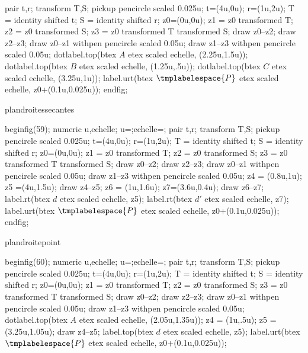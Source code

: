 {{{\begin{mplibcode}[PfLAC]
				pair t,r;
				transform T,S;
				pickup pencircle scaled 0.025u;
				t=(4u,0u); r=(1u,2u);
				T = identity shifted t;
				S = identity shifted r;
				z0=(0u,0u);
				z1 = z0 transformed T;
				z2 = z0 transformed S;
				z3 = z0 transformed T transformed S;
				draw z0--z2;
				draw z2--z3;
				draw z0--z1 withpen pencircle scaled 0.05u;
				draw z1--z3 withpen pencircle scaled 0.05u;
				dotlabel.top(btex $A$ etex scaled echelle, (2.25u,1.5u));
				dotlabel.top(btex $B$ etex scaled echelle, (1.25u,.5u));
				dotlabel.top(btex $C$ etex scaled echelle, (3.25u,1u));
				label.urt(btex $\tmplabelespace{P}$ etex scaled echelle, z0+(0.1u,0.025u));
				endfig;
			\end{mplibcode}
		}%
		{plandroitessecantes}{%
			\begin{mplibcode}[PfLAD]
				beginfig(59);
				numeric u,echelle;
				u=\scaleminischemspace*1cm;echelle=\scaleminischemspace;
				pair t,r;
				transform T,S;
				pickup pencircle scaled 0.025u;
				t=(4u,0u); r=(1u,2u);
				T = identity shifted t;
				S = identity shifted r;
				z0=(0u,0u);
				z1 = z0 transformed T;
				z2 = z0 transformed S;
				z3 = z0 transformed T transformed S;
				draw z0--z2;
				draw z2--z3;
				draw z0--z1 withpen pencircle scaled 0.05u;
				draw z1--z3 withpen pencircle scaled 0.05u;
				z4 = (0.8u,1u);
				z5 =(4u,1.5u);
				draw z4--z5;
				z6 = (1u,1.6u);
				z7=(3.6u,0.4u);
				draw z6--z7;
				label.rt(btex $d$ etex scaled echelle, z5);
				label.rt(btex $d'$ etex scaled echelle, z7);
				label.urt(btex $\tmplabelespace{P}$ etex scaled echelle, z0+(0.1u,0.025u));
				endfig;
			\end{mplibcode}
		}%
		{plandroitepoint}{%
			\begin{mplibcode}[PfLAE]
				beginfig(60);
				numeric u,echelle;
				u=\scaleminischemspace*1cm;echelle=\scaleminischemspace;
				pair t,r;
				transform T,S;
				pickup pencircle scaled 0.025u;
				t=(4u,0u); r=(1u,2u);
				T = identity shifted t;
				S = identity shifted r;
				z0=(0u,0u);
				z1 = z0 transformed T;
				z2 = z0 transformed S;
				z3 = z0 transformed T transformed S;
				draw z0--z2;
				draw z2--z3;
				draw z0--z1 withpen pencircle scaled 0.05u;
				draw z1--z3 withpen pencircle scaled 0.05u;
				dotlabel.top(btex $A$ etex scaled echelle, (2.05u,1.35u));
				z4 = (1u,.5u);
				z5 = (3.25u,1.05u);
				draw z4--z5;
				label.top(btex $d$ etex scaled echelle, z5);
				label.urt(btex $\tmplabelespace{P}$ etex scaled echelle, z0+(0.1u,0.025u));

\end{mplibcode}}}}
